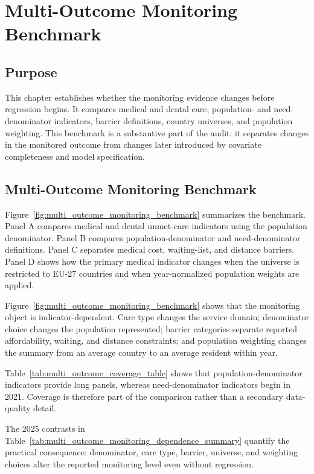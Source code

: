 \chapter{Multi-Outcome Monitoring Benchmark}
\label{ch:descriptive_evidence}

\section{Purpose}

This chapter establishes whether the monitoring evidence changes before regression begins. It compares medical and dental care, population- and need-denominator indicators, barrier definitions, country universes, and population weighting. This benchmark is a substantive part of the audit: it separates changes in the monitored outcome from changes later introduced by covariate completeness and model specification.

\section{Multi-Outcome Monitoring Benchmark}

Figure~\ref{fig:multi_outcome_monitoring_benchmark} summarizes the benchmark. Panel A compares medical and dental unmet-care indicators using the population denominator. Panel B compares population-denominator and need-denominator definitions. Panel C separates medical cost, waiting-list, and distance barriers. Panel D shows how the primary medical indicator changes when the universe is restricted to EU-27 countries and when year-normalized population weights are applied.

Figure~\ref{fig:multi_outcome_monitoring_benchmark} shows that the monitoring object is indicator-dependent. Care type changes the service domain; denominator choice changes the population represented; barrier categories separate reported affordability, waiting, and distance constraints; and population weighting changes the summary from an average country to an average resident within year.

Table~\ref{tab:multi_outcome_coverage_table} shows that population-denominator indicators provide long panels, whereas need-denominator indicators begin in 2021. Coverage is therefore part of the comparison rather than a secondary data-quality detail.

The 2025 contrasts in Table~\ref{tab:multi_outcome_monitoring_dependence_summary} quantify the practical consequence: denominator, care type, barrier, universe, and weighting choices alter the reported monitoring level even without regression.

